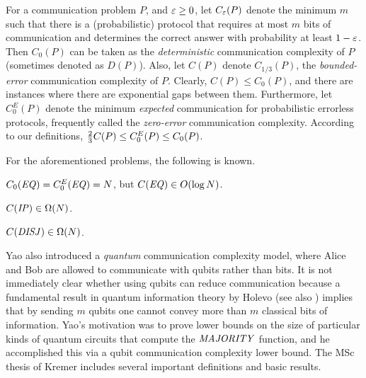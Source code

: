 For a communication problem $P$, and $\varepsilon \ge 0$, let $C_{\varepsilon}(P)$ denote 
the minimum $m$ such that there is a (probabilistic) protocol that requires 
at most $m$ bits of communication and determines the correct answer with 
probability at least $1-\varepsilon$.
Then $C_0(P)$ can be taken as the {\em deterministic} communication 
complexity of $P$ (sometimes denoted as $D(P)$).
Also, let $C(P)$ denote $C_{1/3}(P)$, the {\em bounded-error} communication 
complexity of $P$.
Clearly, $C(P) \leq C_0(P)$, and there are instances where there are 
exponential gaps between them.
Furthermore, let $C^E_0(P)$ denote the minimum {\em expected\/} communication 
for probabilistic errorless protocols, frequently called the {\em zero-error} 
communication complexity.
According to our definitions, ${2 \over 3}C(P) \leq C^E_0(P) \leq C_0(P)$.


For the aforementioned problems, the following is known.

\begin{theorem}\cite{Ya79}
$C_0(\mbox{\it EQ\/}) = C^E_0(\mbox{\it EQ\/}) = N$, but $C(\mbox{\it EQ\/}) \in O(\log N)$.
\end{theorem}

\begin{theorem}\cite{CG88}
$C(\mbox{\it IP\/}) \in \Omega(N)$.
\end{theorem}

\begin{theorem}\label{dis_lb} \cite{KS87,Raz90}
$C(\mbox{\it DISJ\/}) \in \Omega(N)$.
\end{theorem}

Yao \cite{Ya93} also introduced a {\em quantum} communication complexity 
model, where Alice and Bob are allowed to communicate with qubits rather 
than bits.
It is not immediately clear whether using qubits can reduce communication 
because a fundamental result in quantum information theory by Holevo 
\cite{Hol73} (see also \cite{FC94}) implies that by sending 
$m$ qubits one cannot convey more than $m$ classical bits of information.
Yao's motivation was to prove lower bounds on the size of particular kinds 
of quantum circuits that compute the $\mbox{\it MAJORITY\/}$ function, and he 
accomplished this via a qubit communication complexity lower bound.
The MSc thesis of Kremer \cite{Kr95} includes several important definitions 
and basic results.


